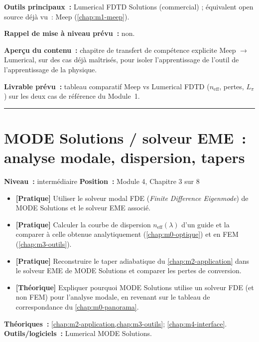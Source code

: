 \noindent\textbf{Outils principaux~:} Lumerical FDTD Solutions (commercial) ; équivalent open source déjà vu~: Meep (\cref{chap:m1-meep}).

\noindent\textbf{Rappel de mise à niveau prévu~:} non.

\noindent\textbf{Aperçu du contenu~:} chapitre de \og transfert de compétence\fg{} explicite Meep $\to$ Lumerical, sur des cas déjà maîtrisés, pour isoler l'apprentissage de l'outil de l'apprentissage de la physique.

\noindent\textbf{Livrable prévu~:} tableau comparatif Meep vs Lumerical FDTD ($n_{\text{eff}}$, pertes, $L_\pi$) sur les deux cas de référence du Module~1.

\bigskip\hrule\bigskip

\chapter{MODE Solutions / solveur EME~: analyse modale, dispersion, tapers}
\label{chap:m4-mode}

\noindent\textbf{Niveau~:} intermédiaire \hfill \textbf{Position~:} Module 4, Chapitre 3 sur 8

\begin{objectifs}
\begin{itemize}[leftmargin=1.4em]
  \item \textbf{[Pratique]} Utiliser le solveur modal FDE (\emph{Finite Difference Eigenmode}) de MODE Solutions et le solveur EME associé.
  \item \textbf{[Pratique]} Calculer la courbe de dispersion $n_{\text{eff}}(\lambda)$ d'un guide et la comparer à celle obtenue analytiquement (\cref{chap:m0-optique}) et en FEM (\cref{chap:m3-outils}).
  \item \textbf{[Pratique]} Reconstruire le taper adiabatique du \cref{chap:m2-application} dans le solveur EME de MODE Solutions et comparer les pertes de conversion.
  \item \textbf{[Théorique]} Expliquer pourquoi MODE Solutions utilise un solveur FDE (et non FEM) pour l'analyse modale, en revenant sur le tableau de correspondance du \cref{chap:m0-panorama}.
\end{itemize}
\end{objectifs}

\begin{prerequis}
\textbf{Théoriques~:} \cref{chap:m2-application,chap:m3-outils}; \cref{chap:m4-interface}.\\
\textbf{Outils/logiciels~:} Lumerical MODE Solutions.
\end{prerequis}

